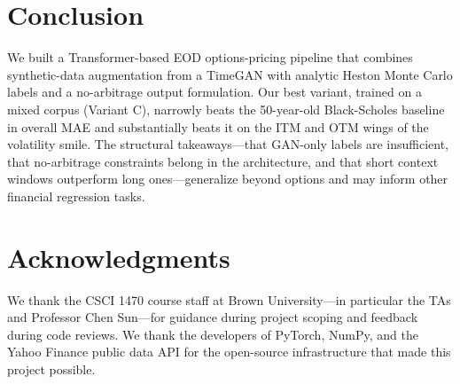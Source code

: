 \documentclass[conference]{IEEEtran}
\begin{document}
\section{Conclusion}

We built a Transformer-based EOD options-pricing pipeline that
combines synthetic-data augmentation from a TimeGAN with
analytic Heston Monte Carlo labels and a no-arbitrage output
formulation. Our best variant, trained on a mixed corpus
(Variant C), narrowly beats the 50-year-old Black-Scholes
baseline in overall MAE and substantially beats it on the
ITM and OTM wings of the volatility smile. The structural
takeaways---that GAN-only labels are insufficient, that
no-arbitrage constraints belong in the architecture, and that
short context windows outperform long ones---generalize beyond
options and may inform other financial regression tasks.

\section*{Acknowledgments}

We thank the CSCI 1470 course staff at Brown University---in
particular the TAs and Professor Chen Sun---for guidance during
project scoping and feedback during code reviews. We thank
the developers of PyTorch, NumPy, and the Yahoo Finance public
data API for the open-source infrastructure that made this
project possible.
\end{document}
